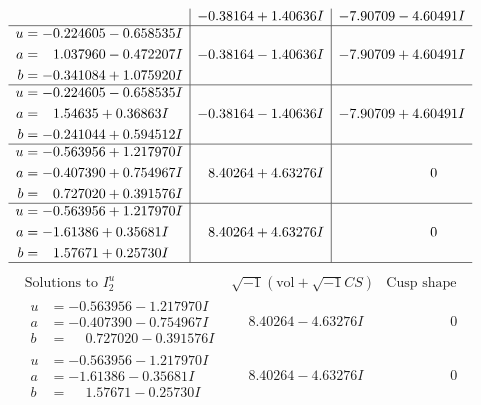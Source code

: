 \documentclass[1p]{elsarticle_modified}
\theoremstyle{definition}
\newcommand{\I}{\sqrt{-1}}
\begin{document}
$$\begin{array}{c|c|c}
 & -0.38164 + 1.40636 I & -7.90709 - 4.60491 I \\ \hline\begin{aligned}
u &= -0.224605 - 0.658535 I \\
a &= \phantom{-}1.037960 - 0.472207 I \\
b &= -0.341084 + 1.075920 I\end{aligned}
 & -0.38164 - 1.40636 I & -7.90709 + 4.60491 I \\ \hline\begin{aligned}
u &= -0.224605 - 0.658535 I \\
a &= \phantom{-}1.54635 + 0.36863 I \\
b &= -0.241044 + 0.594512 I\end{aligned}
 & -0.38164 - 1.40636 I & -7.90709 + 4.60491 I \\ \hline\begin{aligned}
u &= -0.563956 + 1.217970 I \\
a &= -0.407390 + 0.754967 I \\
b &= \phantom{-}0.727020 + 0.391576 I\end{aligned}
 & \phantom{-}8.40264 + 4.63276 I & \phantom{-0.000000 } 0 \\ \hline\begin{aligned}
u &= -0.563956 + 1.217970 I \\
a &= -1.61386 + 0.35681 I \\
b &= \phantom{-}1.57671 + 0.25730 I\end{aligned}
 & \phantom{-}8.40264 + 4.63276 I & \phantom{-0.000000 } 0\\
 \hline 
 \end{array}$$\newpage$$\begin{array}{c|c|c}  
\text{Solutions to }I^u_{2}& \I (\text{vol} + \sqrt{-1}CS) & \text{Cusp shape}\\
 \hline 
\begin{aligned}
u &= -0.563956 - 1.217970 I \\
a &= -0.407390 - 0.754967 I \\
b &= \phantom{-}0.727020 - 0.391576 I\end{aligned}
 & \phantom{-}8.40264 - 4.63276 I & \phantom{-0.000000 } 0 \\ \hline\begin{aligned}
u &= -0.563956 - 1.217970 I \\
a &= -1.61386 - 0.35681 I \\
b &= \phantom{-}1.57671 - 0.25730 I\end{aligned}
 & \phantom{-}8.40264 - 4.63276 I & \phantom{-0.000000 } 0 \\ \hline\begin{aligned}

\end{aligned}
\end{array}$$
\end{document}
